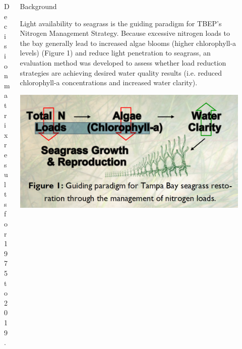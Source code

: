 \documentclass[final,t]{beamer}\usepackage[]{graphicx}\usepackage[]{color}
\begin{document}
\begin{frame}
\begin{columns}[t]
\begin{column}{.34\linewidth}
\begin{figure}
\caption{\footnotesize Decision matrix results for 1975 to 2019.}
\label{fig:attainmat}
\end{figure}

\end{column}

\begin{column}{.65\linewidth}

\begin{block}{Background}
\begin{minipage}{0.5\textwidth}
\footnotesize
Light availability to seagrass is the guiding paradigm for TBEP's Nitrogen Management Strategy. Because excessive nitrogen loads to the bay generally lead to increased algae blooms (higher chlorophyll-a levels) (Figure 1) and reduce light penetration to seagrass, an evaluation method was developed to assess whether load reduction strategies are achieving desired water quality results (i.e. reduced chlorophyll-a concentrations and increased water clarity). 
\end{minipage}
\hspace{0.01in}
\begin{minipage}{0.45\textwidth}
\includegraphics[width=\textwidth]{www/nitro.PNG}
\end{minipage}
\end{block}


\end{column}
\end{columns}
\end{frame}
\end{document}
